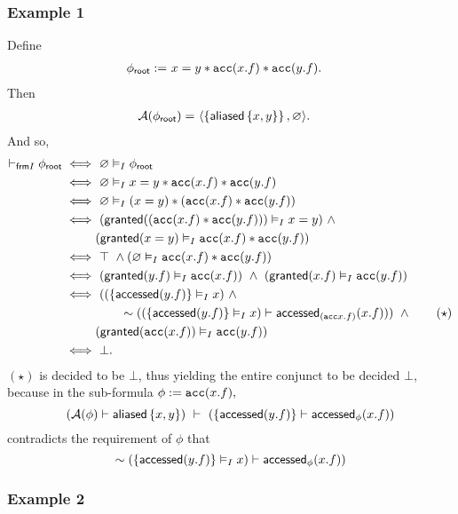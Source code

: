 \subsubsection*{Example 1}

Define
\begin{align*}
{\phi_\textsf{root}} := & \ x = y \ast \texttt{acc}(x.f) \ast \texttt{acc}(y.f).
\end{align*}
Then
\begin{align*}
\mathcal{A}({\phi_\textsf{root}}) = & \ \langle  \left\{ \textsf{aliased}\left\{ x,y \right\} \right\} ,  \varnothing  \rangle.
\end{align*}
And so,
\begin{align*}
\vdash_{\textsf{frm}I} {\phi_\textsf{root}}
\iff & \
\varnothing \vDash_I {\phi_\textsf{root}}
\\ \iff & \
\varnothing \vDash_I x = y \ast \texttt{acc}(x.f) \ast \texttt{acc}(y.f)
\\ \iff & \
\varnothing \vDash_I (x = y) \ast (\texttt{acc}(x.f) \ast \texttt{acc}(y.f))
\\ \iff & \
(\textsf{granted}((\texttt{acc}(x.f) \ast \texttt{acc}(y.f))) \vDash_I x = y) \ \land \\ &
(\textsf{granted}(x = y) \vDash_I \texttt{acc}(x.f) \ast \texttt{acc}(y.f))
\\ \iff & \
\top \ \land (\varnothing \vDash_I \texttt{acc}(x.f) \ast \texttt{acc}(y.f))
\\ \iff & \
(\textsf{granted}(y.f) \vDash_I \texttt{acc}(x.f)) \ \land \
(\textsf{granted}(x.f) \vDash_I \texttt{acc}(y.f))
\\ \iff & \
(
  (\left\{  \textsf{accessed}(y.f)  \right\} \vDash_I x) \ \land \\ & \hspace{2em}
  \sim ((\left\{  \textsf{accessed}(y.f)  \right\} \vDash_I x) \vdash \textsf{accessed}_{(\texttt{acc}{x.f})}(x.f))
)
\ \land \tag{$\star$} \\ &
(\textsf{granted}(\texttt{acc}(x.f)) \vDash_I \texttt{acc}(y.f))
\\ \iff & \
\bot.
\end{align*}
$(\star)$ is decided to be $\bot$, thus yielding the entire conjunct to be decided $\bot$, because in the sub-formula $\phi := \texttt{acc}(x.f),$
$$
  (\mathcal{A}(\phi) \vdash \textsf{aliased}\left\{ x,y \right\}) \ \vdash \
  (\left\{  \textsf{accessed}(y.f)  \right\} \vdash \textsf{accessed}_{\phi}(x.f))
$$
contradicts the requirement of $\phi$ that
$$
  \sim (\left\{  \textsf{accessed}(y.f)  \right\} \vDash_I x) \vdash \textsf{accessed}_\phi(x.f))
$$

\subsubsection*{Example 2}

